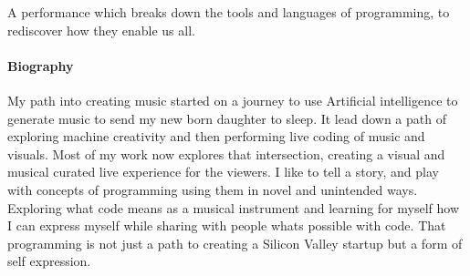 \documentclass[sigplan,10pt,review]{acmart}\settopmatter{printfolios=true}
\begin{document}
A performance which breaks down the tools and languages of
programming, to rediscover how they enable us all.

\paragraph{Biography}
My path into creating music started on a journey to use Artificial
intelligence to generate music to send my new born daughter to
sleep. It lead down a path of exploring machine creativity and then
performing live coding of music and visuals. Most of my work now
explores that intersection, creating a visual and musical curated live
experience for the viewers. I like to tell a story, and play with
concepts of programming using them in novel and unintended
ways. Exploring what code means as a musical instrument and learning
for myself how I can express myself while sharing with people whats
possible with code. That programming is not just a path to creating a
Silicon Valley startup but a form of self expression.


\end{document}
